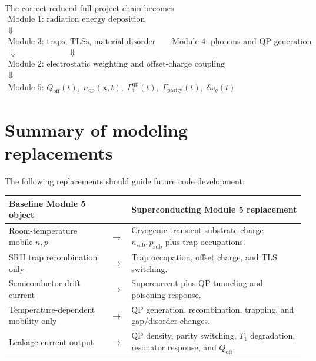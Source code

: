 \documentclass[11pt]{article}
\newcommand{\x}{\bm{x}}
\newcommand{\nqp}{n_{\mathrm{qp}}}
\newcommand{\Qoff}{Q_{\mathrm{off}}}
\begin{document}
The correct reduced full-project chain becomes
\begin{equation}
\boxed{
\begin{gathered}
\text{Module 1: radiation energy deposition}\\
\Downarrow\\
\text{Module 3: traps, TLSs, material disorder} \qquad \text{Module 4: phonons and QP generation}\\
\Downarrow \qquad\qquad\qquad\Downarrow\\
\text{Module 2: electrostatic weighting and offset-charge coupling}\\
\Downarrow\\
\text{Module 5: } \Qoff(t),\;\nqp(\x,t),\;\Gamma_1^{\mathrm{qp}}(t),\;\Gamma_{\mathrm{parity}}(t),\;\delta\omega_q(t)
\end{gathered}}
\end{equation}

\section{Summary of modeling replacements}

The following replacements should guide future code development:

\begin{center}
\begin{tabularx}{\textwidth}{>{\RaggedRight\arraybackslash}p{}>{\centering\arraybackslash}p{}>{\RaggedRight\arraybackslash}X}
\toprule
\textbf{Baseline Module 5 object} & & \textbf{Superconducting Module 5 replacement} \\
\midrule
Room-temperature mobile \(n,p\) & \(\rightarrow\) & Cryogenic transient substrate charge \(n_{\mathrm{sub}},p_{\mathrm{sub}}\) plus trap occupations. \\
SRH trap recombination only & \(\rightarrow\) & Trap occupation, offset charge, and TLS switching. \\
Semiconductor drift current & \(\rightarrow\) & Supercurrent plus QP tunneling and poisoning response. \\
Temperature-dependent mobility only & \(\rightarrow\) & QP generation, recombination, trapping, and gap/disorder changes. \\
Leakage-current output & \(\rightarrow\) & QP density, parity switching, \(T_1\) degradation, resonator response, and \(Q_{\mathrm{off}}\). \\
\bottomrule
\end{tabularx}
\end{center}
\end{document}
